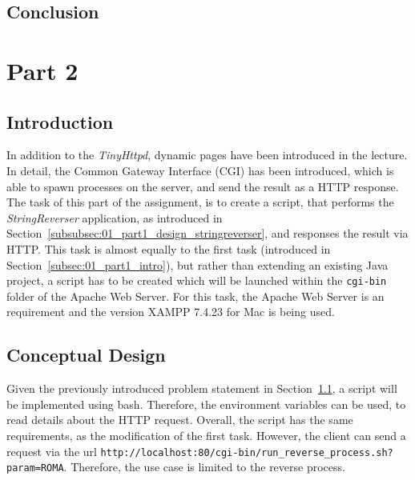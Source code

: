 \documentclass{article}
\def\Sec#1{Section~\ref{#1}}
\begin{document}


\subsection{Conclusion}\label{subsec:01_part1_concl}




\section{Part 2}\label{sec:02_part2}

\subsection{Introduction}\label{subsec:02_part2_intro}
In addition to the \textit{TinyHttpd}, dynamic pages have been introduced in the lecture. In detail, the Common Gateway Interface (CGI) has been introduced, which is able to spawn processes on the server, and send the result as a HTTP response.
The task of this part of the assignment, is to create a script, that performs the \textit{StringReverser} application, as introduced in \Sec{subsubsec:01_part1_design_stringreverser}, and responses the result via HTTP. This task is almost equally to the first task (introduced in \Sec{subsec:01_part1_intro}), but rather than extending an existing Java project, a script has to be created which will be launched within the \texttt{cgi-bin} folder of the Apache Web Server.
For this task, the Apache Web Server is an requirement and the version XAMPP 7.4.23 for Mac is being used. 

\subsection{Conceptual Design}\label{subsec:02_part2_design}
Given the previously introduced problem statement in \Sec{subsec:02_part2_intro}, a script will be implemented using bash. Therefore, the environment variables can be used, to read details about the HTTP request.
Overall, the script has the same requirements, as the modification of the first task. However, the client can send a request via the url \texttt{http://localhost:80/cgi-bin/run\_reverse\_process.sh?param=ROMA}. Therefore, the use case is limited to the reverse process.
\end{document}
